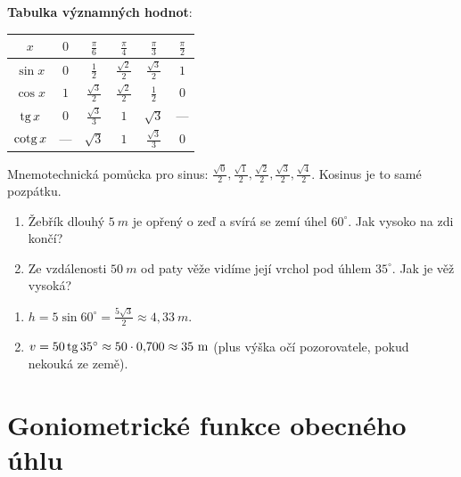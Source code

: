 \begin{definitionbox}
  \textbf{Tabulka významných hodnot}:
  \begin{center}
    \renewcommand{\arraystretch}{1.6}
    \begin{tabular}{|c|c|c|c|c|c|}
      \hline
      $x$ & $0$ & $\frac{\pi}{6}$ & $\frac{\pi}{4}$ & $\frac{\pi}{3}$ & $\frac{\pi}{2}$ \\
      \hline
      $\sin x$ & $0$ & $\frac{1}{2}$ & $\frac{\sqrt{2}}{2}$ & $\frac{\sqrt{3}}{2}$ & $1$ \\
      $\cos x$ & $1$ & $\frac{\sqrt{3}}{2}$ & $\frac{\sqrt{2}}{2}$ & $\frac{1}{2}$ & $0$ \\
      $\tg x$ & $0$ & $\frac{\sqrt{3}}{3}$ & $1$ & $\sqrt{3}$ & --- \\
      $\cotg x$ & --- & $\sqrt{3}$ & $1$ & $\frac{\sqrt{3}}{3}$ & $0$ \\
      \hline
    \end{tabular}
  \end{center}
  Mnemotechnická pomůcka pro sinus: $\frac{\sqrt{0}}{2}, \frac{\sqrt{1}}{2}, \frac{\sqrt{2}}{2}, \frac{\sqrt{3}}{2}, \frac{\sqrt{4}}{2}$. Kosinus je to samé pozpátku.
\end{definitionbox}

\begin{problem}
  \begin{enumerate}[label=(\alph*)]
    \item Žebřík dlouhý $5\ \si{m}$ je opřený o zeď a svírá se zemí úhel $60^\circ$. Jak vysoko na zdi končí?
    \item Ze vzdálenosti $50\ \si{m}$ od paty věže vidíme její vrchol pod úhlem $35^\circ$. Jak je věž vysoká?
  \end{enumerate}
\end{problem}

\begin{solution}
  \begin{enumerate}[label=(\alph*)]
    \item $h = 5\sin 60^\circ = \frac{5\sqrt{3}}{2}\approx 4{,}33\ \si{m}$.
    \item $v = 50\tg 35^\circ\approx 50\cdot 0{,}700\approx 35\ \si{m}$ (plus výška očí pozorovatele, pokud nekouká ze země).
  \end{enumerate}
\end{solution}

\section{Goniometrické funkce obecného úhlu}\label{sec:gon-obecny-uhel}

